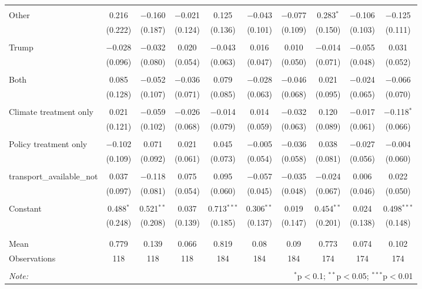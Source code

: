 \begin{tabular}{@{\extracolsep{5pt}}lccccccccc}
  & & & & & & & & & \\ 
 Other & 0.216 & $-$0.160 & $-$0.021 & 0.125 & $-$0.043 & $-$0.077 & 0.283$^{*}$ & $-$0.106 & $-$0.125 \\ 
  & (0.222) & (0.187) & (0.124) & (0.136) & (0.101) & (0.109) & (0.150) & (0.103) & (0.111) \\ 
  & & & & & & & & & \\ 
 Trump & $-$0.028 & $-$0.032 & 0.020 & $-$0.043 & 0.016 & 0.010 & $-$0.014 & $-$0.055 & 0.031 \\ 
  & (0.096) & (0.080) & (0.054) & (0.063) & (0.047) & (0.050) & (0.071) & (0.048) & (0.052) \\ 
  & & & & & & & & & \\ 
 Both & 0.085 & $-$0.052 & $-$0.036 & 0.079 & $-$0.028 & $-$0.046 & 0.021 & $-$0.024 & $-$0.066 \\ 
  & (0.128) & (0.107) & (0.071) & (0.085) & (0.063) & (0.068) & (0.095) & (0.065) & (0.070) \\ 
  & & & & & & & & & \\ 
 Climate treatment only & 0.021 & $-$0.059 & $-$0.026 & $-$0.014 & 0.014 & $-$0.032 & 0.120 & $-$0.017 & $-$0.118$^{*}$ \\ 
  & (0.121) & (0.102) & (0.068) & (0.079) & (0.059) & (0.063) & (0.089) & (0.061) & (0.066) \\ 
  & & & & & & & & & \\ 
 Policy treatment only & $-$0.102 & 0.071 & 0.021 & 0.045 & $-$0.005 & $-$0.036 & 0.038 & $-$0.027 & $-$0.004 \\ 
  & (0.109) & (0.092) & (0.061) & (0.073) & (0.054) & (0.058) & (0.081) & (0.056) & (0.060) \\ 
  & & & & & & & & & \\ 
 transport\_available\_not & 0.037 & $-$0.118 & 0.075 & 0.095 & $-$0.057 & $-$0.035 & $-$0.024 & 0.006 & 0.022 \\ 
  & (0.097) & (0.081) & (0.054) & (0.060) & (0.045) & (0.048) & (0.067) & (0.046) & (0.050) \\ 
  & & & & & & & & & \\ 
 Constant & 0.488$^{*}$ & 0.521$^{**}$ & 0.037 & 0.713$^{***}$ & 0.306$^{**}$ & 0.019 & 0.454$^{**}$ & 0.024 & 0.498$^{***}$ \\ 
  & (0.248) & (0.208) & (0.139) & (0.185) & (0.137) & (0.147) & (0.201) & (0.138) & (0.148) \\ 
  & & & & & & & & & \\ 
\hline \\[-1.8ex] 
Mean & 0.779 & 0.139 & 0.066 & 0.819 & 0.08 & 0.09 & 0.773 & 0.074 & 0.102 \\ 
Observations & 118 & 118 & 118 & 184 & 184 & 184 & 174 & 174 & 174 \\ 
\hline 
\hline \\[-1.8ex] 
\textit{Note:}  & \multicolumn{9}{r}{$^{*}$p$<$0.1; $^{**}$p$<$0.05; $^{***}$p$<$0.01} \\ 
\end{tabular} 
